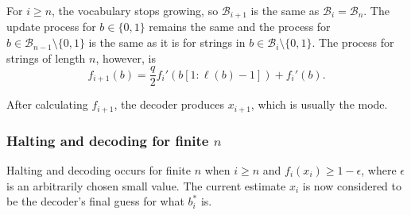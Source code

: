 \documentclass{IEEEtran}
\begin{document}
For $i \geq n$, the vocabulary stops growing, so $\mathcal{B}_{i+1}$
is the same as $\mathcal{B}_i=\mathcal{B}_n$.
The update process for $b \in \{0,1\}$ remains the same
and the process for $b \in \mathcal{B}_{n-1}\setminus\{0,1\}$ is the same
as it is for strings in $b \in \mathcal{B}_i\setminus\{0,1\}$. The process
for strings of length $n$, however, is
\begin{equation}
f_{i+1}(b) = \frac{q}{2}f_i'(b[1:\ell(b)-1])+f_i'(b).
\end{equation}

After calculating $f_{i+1}$, the decoder produces $x_{i+1}$, which is usually
the mode.
\subsubsection{Halting and decoding for finite $n$}
Halting and decoding occurs for finite $n$ when $i \geq n$ and
$f_i(x_i) \geq 1-\epsilon$, where
$\epsilon$ is an arbitrarily chosen small value. The current
estimate $x_i$ is now considered
to be the decoder's final guess for what $b_i^*$ is.
\end{document}
